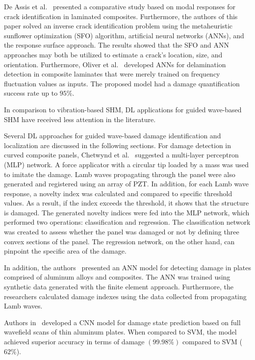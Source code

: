 De Assis et al.~\cite{DeAssis2021} presented a comparative study based on modal responses for crack identification in laminated composites.
Furthermore, the authors of this paper solved an inverse crack identification problem using the metaheuristic sunflower optimization (SFO) algorithm, artificial neural networks (ANNs), and the response surface approach.
The results showed that the SFO and ANN approaches may both be utilized to estimate a crack's location, size, and orientation.
Furthermore, Oliver et al.~\cite{Oliver2021} developed ANNs for delamination detection in composite laminates that were merely trained on frequency fluctuation values as inputs.
The proposed model had a damage quantification success rate up to \(95\% \).

In comparison to vibration-based SHM, DL applications for guided wave-based SHM have received less attention in the literature.

Several DL approaches for guided wave-based damage identification and localization are discussed in the following sections.
For damage detection in curved composite panels, Chetwynd et al.~\cite{Chetwynd2008damage} suggested a multi-layer perceptron (MLP) network.
A force applicator with a circular tip loaded by a mass was used to imitate the damage.
Lamb waves propagating through the panel were also generated and registered using an array of PZT.
In addition, for each Lamb wave response, a novelty index was calculated and compared to specific threshold values.
As a result, if the index exceeds the threshold, it shows that the structure is damaged.
The generated novelty indices were fed into the MLP network, which performed two operations: classification and regression.
The classification network was created to assess whether the panel was damaged or not by defining three convex sections of the panel.
The regression network, on the other hand, can pinpoint the specific area of the damage.

In addition, the authors~\cite{DeFenza2015} presented an ANN model for detecting damage in plates comprised of aluminum alloys and composites.
The ANN was trained using synthetic data generated with the finite element approach.
Furthermore, the researchers calculated damage indexes using the data collected from propagating Lamb waves.

Authors in~\cite{Melville2018} developed a CNN model for damage state prediction based on full wavefield scans of thin aluminum plates.
When compared to SVM, the model achieved superior accuracy in terms of damage $(99.98\%)$ compared to SVM ($62\%$).

